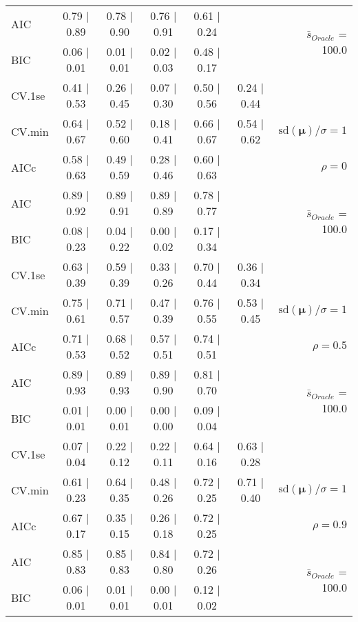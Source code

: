 \begin{table}
\begin{center}
\begin{tabular}{l*{5}{c}|r}
AIC & 0.79 $\mid$ 0.89 & 0.78 $\mid$ 0.90 & 0.76 $\mid$ 0.91 & 0.61 $\mid$ 0.24 & &  \multirow{2}{*}{$\bar{s}_{Oracle}$ = 100.0} \\
BIC & 0.06 $\mid$ 0.01 & 0.01 $\mid$ 0.01 & 0.02 $\mid$ 0.03 & 0.48 $\mid$ 0.17 & &  \\
 \hline 
CV.1se & 0.41 $\mid$ 0.53 & 0.26 $\mid$ 0.45 & 0.07 $\mid$ 0.30 & 0.50 $\mid$ 0.56 & 0.24 $\mid$ 0.44 & \\
CV.min & 0.64 $\mid$ 0.67 & 0.52 $\mid$ 0.60 & 0.18 $\mid$ 0.41 & 0.66 $\mid$ 0.67 & 0.54 $\mid$ 0.62 &  $\mathrm{sd}(\mathbf{\mu})/\sigma=1$ \\
AICc & 0.58 $\mid$ 0.63 & 0.49 $\mid$ 0.59 & 0.28 $\mid$ 0.46 & 0.60 $\mid$ 0.63 & & $\rho=0$ \\
AIC & 0.89 $\mid$ 0.92 & 0.89 $\mid$ 0.91 & 0.89 $\mid$ 0.89 & 0.78 $\mid$ 0.77 & &  \multirow{2}{*}{$\bar{s}_{Oracle}$ = 100.0} \\
BIC & 0.08 $\mid$ 0.23 & 0.04 $\mid$ 0.22 & 0.00 $\mid$ 0.02 & 0.17 $\mid$ 0.34 & &  \\
 \hline 
CV.1se & 0.63 $\mid$ 0.39 & 0.59 $\mid$ 0.39 & 0.33 $\mid$ 0.26 & 0.70 $\mid$ 0.44 & 0.36 $\mid$ 0.34 & \\
CV.min & 0.75 $\mid$ 0.61 & 0.71 $\mid$ 0.57 & 0.47 $\mid$ 0.39 & 0.76 $\mid$ 0.55 & 0.53 $\mid$ 0.45 &  $\mathrm{sd}(\mathbf{\mu})/\sigma=1$ \\
AICc & 0.71 $\mid$ 0.53 & 0.68 $\mid$ 0.52 & 0.57 $\mid$ 0.51 & 0.74 $\mid$ 0.51 & & $\rho=0.5$ \\
AIC & 0.89 $\mid$ 0.93 & 0.89 $\mid$ 0.93 & 0.89 $\mid$ 0.90 & 0.81 $\mid$ 0.70 & &  \multirow{2}{*}{$\bar{s}_{Oracle}$ = 100.0} \\
BIC & 0.01 $\mid$ 0.01 & 0.00 $\mid$ 0.01 & 0.00 $\mid$ 0.00 & 0.09 $\mid$ 0.04 & &  \\
 \hline 
CV.1se & 0.07 $\mid$ 0.04 & 0.22 $\mid$ 0.12 & 0.22 $\mid$ 0.11 & 0.64 $\mid$ 0.16 & 0.63 $\mid$ 0.28 & \\
CV.min & 0.61 $\mid$ 0.23 & 0.64 $\mid$ 0.35 & 0.48 $\mid$ 0.26 & 0.72 $\mid$ 0.25 & 0.71 $\mid$ 0.40 &  $\mathrm{sd}(\mathbf{\mu})/\sigma=1$ \\
AICc & 0.67 $\mid$ 0.17 & 0.35 $\mid$ 0.15 & 0.26 $\mid$ 0.18 & 0.72 $\mid$ 0.25 & & $\rho=0.9$ \\
AIC & 0.85 $\mid$ 0.83 & 0.85 $\mid$ 0.83 & 0.84 $\mid$ 0.80 & 0.72 $\mid$ 0.26 & &  \multirow{2}{*}{$\bar{s}_{Oracle}$ = 100.0} \\
BIC & 0.06 $\mid$ 0.01 & 0.01 $\mid$ 0.01 & 0.00 $\mid$ 0.01 & 0.12 $\mid$ 0.02 & &  \\

\end{tabular}
\end{center}
\end{table}
